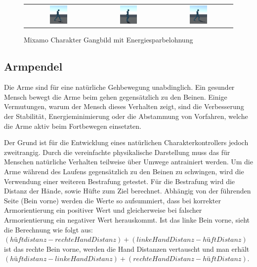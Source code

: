 \begin{figure}[H]
\begin{tabular}{ccc}
    \includegraphics[width=0.27\textwidth]{img/charakter_mixamo_laufen_energiespar4}  & \includegraphics[width=0.27\textwidth]{img/charakter_mixamo_laufen_energiespar5}  & \includegraphics[width=0.27\textwidth]{img/charakter_mixamo_laufen_energiespar6} \\
  \end{tabular}
  \caption{Mixamo Charakter Gangbild mit Energiesparbelohnung}
  \label{fig:mixamo_versuch12_gangbild}
\end{figure}

\subsection{Armpendel}
Die Arme sind für eine natürliche Gehbewegung unabdinglich. Ein gesunder Mensch bewegt die Arme beim gehen gegensätzlich zu den Beinen. Einige Vermutungen, warum der Mensch dieses Verhalten zeigt, sind die Verbesserung der Stabilität, Energieminimierung oder die Abstammung von Vorfahren, welche die Arme aktiv beim Fortbewegen einsetzten.\cite{meyns2013and}

Der Grund ist für die Entwicklung eines natürlichen Charakterkontrollers jedoch zweitrangig. Durch die vereinfachte physikalische Darstellung muss das für Menschen natürliche Verhalten teilweise über Umwege antrainiert werden. Um die Arme während des Laufens gegensätzlich zu den Beinen zu schwingen, wird die Verwendung einer weiteren Bestrafung getestet. Für die Bestrafung wird die Distanz der Hände, sowie Hüfte zum Ziel berechnet. Abhängig von der führenden Seite (Bein vorne) werden die Werte so aufsummiert, dass bei korrekter Armorientierung ein positiver Wert und gleicherweise bei falscher Armorientierung ein negativer Wert herauskommt. Ist das linke Bein vorne, sieht die Berechnung wie folgt aus: $(hüftdistanz - rechteHandDistanz) + (linkeHandDistanz - hüftDistanz)$ ist das rechte Bein vorne, werden die Hand Distanzen vertauscht und man erhält $(hüftdistanz - linkeHandDistanz) + (rechteHandDistanz - hüftDistanz)$.

